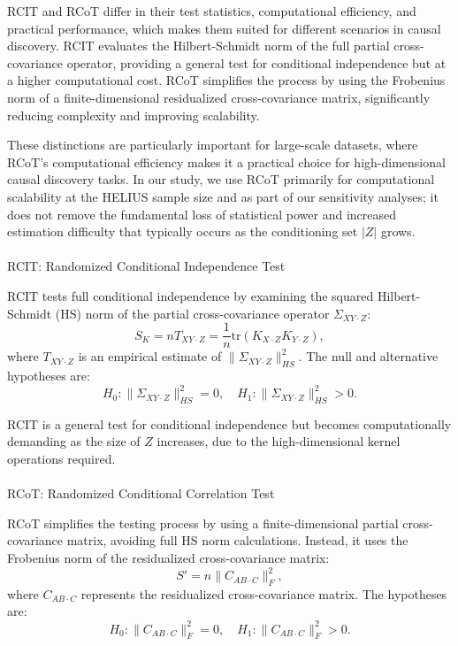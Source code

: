 \documentclass[
]{article}
\makeatletter
\let\oldparagraph\paragraph
\renewcommand{\paragraph}{
    \@ifstar
      \xxxParagraphStar
      \xxxParagraphNoStar
  }
\newcommand{\xxxParagraphStar}[1]{\oldparagraph*{#1}\mbox{}}
\newcommand{\xxxParagraphNoStar}[1]{\oldparagraph{#1}\mbox{}}
\makeatother
\begin{document}
RCIT and RCoT differ in their test statistics, computational efficiency,
and practical performance, which makes them suited for different
scenarios in causal discovery. RCIT evaluates the Hilbert-Schmidt norm
of the full partial cross-covariance operator, providing a general test
for conditional independence but at a higher computational cost. RCoT
simplifies the process by using the Frobenius norm of a
finite-dimensional residualized cross-covariance matrix, significantly
reducing complexity and improving scalability.

These distinctions are particularly important for large-scale datasets,
where RCoT's computational efficiency makes it a practical choice for
high-dimensional causal discovery tasks. In our study, we use RCoT
primarily for computational scalability at the HELIUS sample size and as
part of our sensitivity analyses; it does not remove the fundamental
loss of statistical power and increased estimation difficulty that
typically occurs as the conditioning set \(|Z|\) grows.

\paragraph{RCIT: Randomized Conditional Independence
Test}\label{rcit-randomized-conditional-independence-test}

RCIT tests full conditional independence by examining the squared
Hilbert-Schmidt (HS) norm of the partial cross-covariance operator
\(\Sigma_{XY \cdot Z}\): \[
S_K = n T_{XY \cdot Z} = \frac{1}{n} \text{tr}(K_{X \cdot Z} K_{Y \cdot Z}),
\] where \(T_{XY \cdot Z}\) is an empirical estimate of
\(\|\Sigma_{XY \cdot Z}\|^2_{HS}\). The null and alternative hypotheses
are: \[
H_0: \|\Sigma_{XY \cdot Z}\|^2_{HS} = 0, \quad H_1: \|\Sigma_{XY \cdot Z}\|^2_{HS} > 0.
\]

RCIT is a general test for conditional independence but becomes
computationally demanding as the size of \(Z\) increases, due to the
high-dimensional kernel operations required.

\paragraph{RCoT: Randomized Conditional Correlation
Test}\label{rcot-randomized-conditional-correlation-test}

RCoT simplifies the testing process by using a finite-dimensional
partial cross-covariance matrix, avoiding full HS norm calculations.
Instead, it uses the Frobenius norm of the residualized cross-covariance
matrix: \[
S' = n \|C_{AB \cdot C}\|_F^2,
\] where \(C_{AB \cdot C}\) represents the residualized cross-covariance
matrix. The hypotheses are: \[
H_0: \|C_{AB \cdot C}\|_F^2 = 0, \quad H_1: \|C_{AB \cdot C}\|_F^2 > 0.
\]
\end{document}
